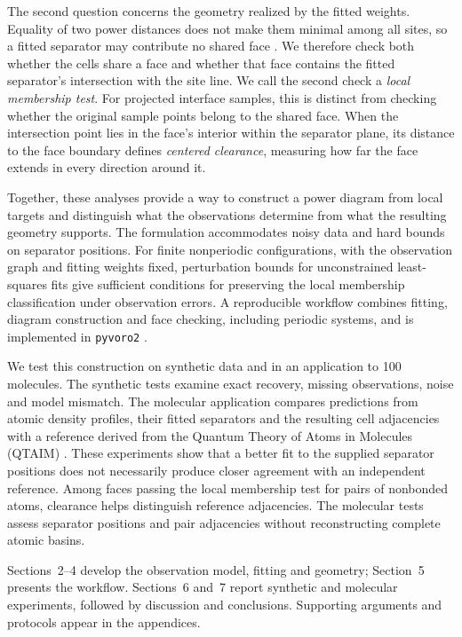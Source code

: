 The second question concerns the geometry realized by the fitted weights. Equality of two power distances does not make them minimal among all sites, so a fitted separator may contribute no shared face \citep{Spettl2016}. We therefore check both whether the cells share a face and whether that face contains the fitted separator's intersection with the site line. We call the second check a \emph{local membership test}. For projected interface samples, this is distinct from checking whether the original sample points belong to the shared face. When the intersection point lies in the face's interior within the separator plane, its distance to the face boundary defines \emph{centered clearance}, measuring how far the face extends in every direction around it.

Together, these analyses provide a way to construct a power diagram from local targets and distinguish what the observations determine from what the resulting geometry supports. The formulation accommodates noisy data and hard bounds on separator positions. For finite nonperiodic configurations, with the observation graph and fitting weights fixed, perturbation bounds for unconstrained least-squares fits give sufficient conditions for preserving the local membership classification under observation errors. A reproducible workflow combines fitting, diagram construction and face checking, including periodic systems, and is implemented in \texttt{pyvoro2} \citep{Pyvoro2_063}.

We test this construction on synthetic data and in an application to 100 molecules. The synthetic tests examine exact recovery, missing observations, noise and model mismatch. The molecular application compares predictions from atomic density profiles, their fitted separators and the resulting cell adjacencies with a reference derived from the Quantum Theory of Atoms in Molecules (QTAIM) \citep{Bader1990}. These experiments show that a better fit to the supplied separator positions does not necessarily produce closer agreement with an independent reference. Among faces passing the local membership test for pairs of nonbonded atoms, clearance helps distinguish reference adjacencies. The molecular tests assess separator positions and pair adjacencies without reconstructing complete atomic basins.

Sections~2--4 develop the observation model, fitting and geometry; Section~5 presents the workflow. Sections~6 and~7 report synthetic and molecular experiments, followed by discussion and conclusions. Supporting arguments and protocols appear in the appendices.
